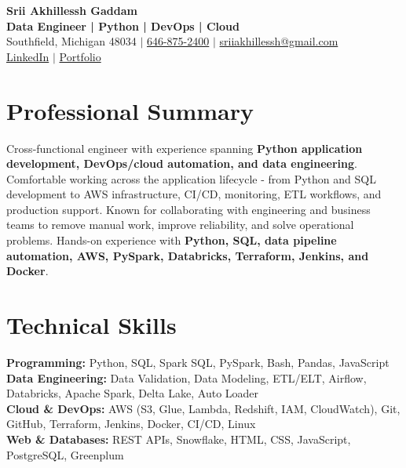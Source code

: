 \documentclass[letterpaper,10pt]{article}
\begin{document}
\fontsize{9.35pt}{10.45pt}\selectfont

\begin{center}
    {\LARGE \textbf{Srii Akhillessh Gaddam}} \\[-1pt]
    \textbf{Data Engineer | Python | DevOps | Cloud} \\[2pt]
    Southfield, Michigan 48034 $|$
    \href{tel:6468752400}{646-875-2400} $|$
    \href{mailto:sriiakhillessh@gmail.com}{sriiakhillessh@gmail.com} \\[1pt]
    \href{https://www.linkedin.com/in/srii-akhiilessh-gaddam-b48668191/}{LinkedIn} $|$
    \href{https://sriiakhillesshg.github.io/portfolio/}{Portfolio}
\end{center}
\vspace{-8pt}

\section{Professional Summary}
\small{Cross-functional engineer with experience spanning \textbf{Python application development, DevOps/cloud automation, and data engineering}. Comfortable working across the application lifecycle - from Python and SQL development to AWS infrastructure, CI/CD, monitoring, ETL workflows, and production support. Known for collaborating with engineering and business teams to remove manual work, improve reliability, and solve operational problems. Hands-on experience with \textbf{Python, SQL, data pipeline automation, AWS, PySpark, Databricks, Terraform, Jenkins, and Docker}.}

\section{Technical Skills}
\small{
\textbf{Programming:} Python, SQL, Spark SQL, PySpark, Bash, Pandas, JavaScript \\
\textbf{Data Engineering:} Data Validation, Data Modeling, ETL/ELT, Airflow, Databricks, Apache Spark, Delta Lake, Auto Loader \\
\textbf{Cloud \& DevOps:} AWS (S3, Glue, Lambda, Redshift, IAM, CloudWatch), Git, GitHub, Terraform, Jenkins, Docker, CI/CD, Linux \\
\textbf{Web \& Databases:} REST APIs, Snowflake, HTML, CSS, JavaScript, PostgreSQL, Greenplum
}

\end{document}
